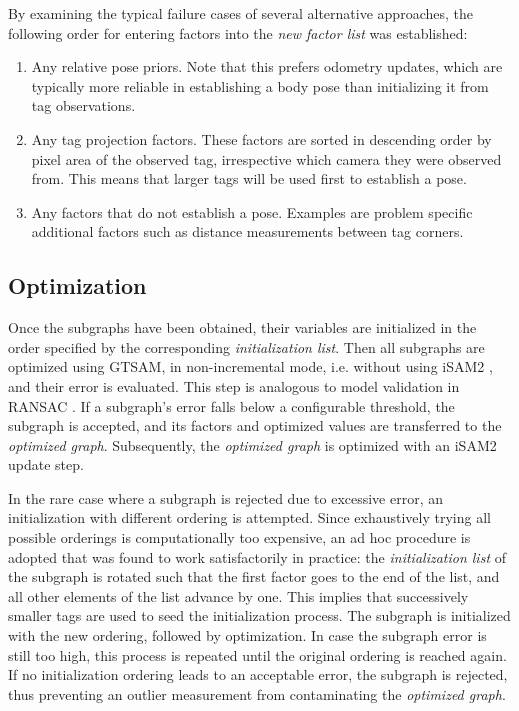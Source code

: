 By examining the typical failure cases of several alternative
approaches, the following order for entering factors into the {\em new
  factor list} was established:
\begin{enumerate}[wide, labelwidth=!, itemsep=-1ex]
\item Any relative pose priors. Note that this prefers odometry
  updates, which are typically more reliable in establishing a body
  pose than initializing it from tag observations.
\item Any tag projection factors. These factors are sorted in
  descending order by pixel area of the observed tag, irrespective
  which camera they were observed from. This means that larger tags
  will be used first to establish a pose.
\item Any factors that do not establish a pose. Examples are problem
  specific additional factors such as distance measurements between
  tag corners.
\end{enumerate}

\subsection{Optimization}
Once the subgraphs have been obtained, their variables are initialized
in the order specified by the corresponding {\em initialization
  list}. Then all subgraphs are optimized using GTSAM, in
non-incremental mode, i.e. without using iSAM2 \cite{kaess2011}, and
their error is evaluated. This step is analogous to model validation
in RANSAC \cite{fischler1981}. If a subgraph's error falls below a
configurable threshold, the subgraph is accepted, and its factors and
optimized values are transferred to the {\em optimized
  graph}. Subsequently, the {\em optimized graph} is optimized with an
iSAM2 update step.

In the rare case where a subgraph is rejected due to excessive error,
an initialization with different ordering is attempted. Since
exhaustively trying all possible orderings is computationally too
expensive, an ad hoc procedure is adopted that was found to work
satisfactorily in practice: the {\em initialization list} of the
subgraph is rotated such that the first factor goes to the end of the
list, and all other elements of the list advance by one. This implies
that successively smaller tags are used to seed the initialization
process. The subgraph is initialized with the new ordering, followed
by optimization. In case the subgraph error is still too high, this
process is repeated until the original ordering is reached again. If
no initialization ordering leads to an acceptable error, the subgraph
is rejected, thus preventing an outlier measurement from contaminating
the {\em optimized graph}.

